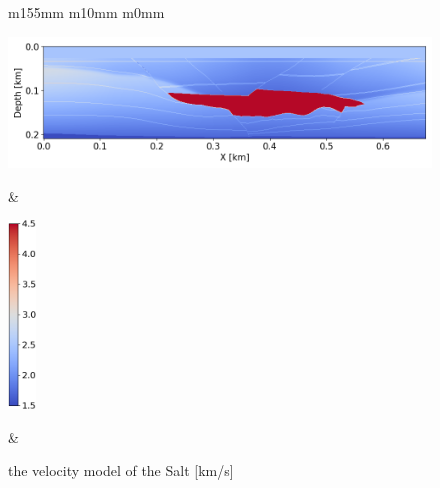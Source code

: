 \begin{figure}[htbp]
    \vspace{3mm}
    \centering
    \begin{tabular}{m{155mm} m{10mm} m{0mm}}
        \begin{minipage}[b]{160mm}
            \centering
            \includegraphics[width=160mm]{public/full_true_vm}
        \end{minipage} &
        \begin{minipage}[b]{\linewidth}
            \centering
            \vspace{-2mm}
            \includegraphics[height=50mm]{public/color-bar}
        \end{minipage} &
    \end{tabular}
    \caption{the velocity model of the Salt [km/s]}
    \label{fig:salt-model}
    \vspace{2mm}
\end{figure}
